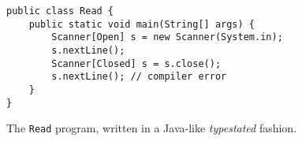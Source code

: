 \begin{listing}
    \centering
    \begin{verbatim}
public class Read {
    public static void main(String[] args) {
        Scanner[Open] s = new Scanner(System.in);
        s.nextLine();
        Scanner[Closed] s = s.close();
        s.nextLine(); // compiler error
    }
}
    \end{verbatim}
    \caption{The \texttt{Read} program, written in a Java-like \emph{typestated} fashion.}
    \label{lst:java-read-typestate}
\end{listing}